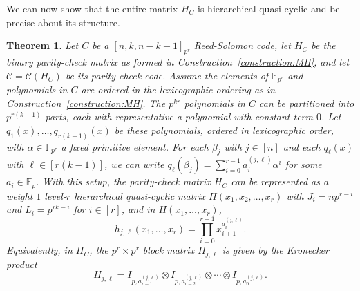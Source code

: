 \documentclass[11pt]{amsart}
\newtheorem{theorem}{Theorem}[section]
\theoremstyle{definition}
\newcommand{\0}{\mathbf{0}}
\newcommand{\F}{\mathbb{F}}
\begin{document}
We can now show that the entire matrix $H_C$ is hierarchical quasi-cyclic and be precise about its structure.

\begin{theorem} \label{thm:hqc-codes}
    Let $C$ be a $[n,k,n-k+1]_{p^r}$ Reed-Solomon code, let $H_C$ be the binary parity-check matrix as formed in Construction~\ref{construction:MH}, and let $\mathcal{C} = \mathcal{C}(H_C)$ be its parity-check code. Assume the elements of $\F_{p^r}$ and polynomials in $C$ are ordered in the lexicographic ordering as in Construction~\ref{construction:MH}. The $p^{kr}$ polynomials in $C$ can be partitioned into $p^{r(k-1)}$ parts, each with representative a polynomial with constant term $0$. Let $q_1(x), \dotsc, q_{r(k-1)}(x)$ be these polynomials, ordered in lexicographic order, with $\alpha \in \F_{p^r}$ a fixed primitive element. For each $\beta_j$ with $j \in [n]$ and each $q_\ell(x)$ with $\ell \in [r(k-1)]$, we can write $q_\ell(\beta_j) = \sum_{i=0}^{r-1} a_i^{(j,\ell)} \alpha^i$ for some $a_i \in \F_p$. With this setup, the parity-check matrix $H_C$ can be represented as a weight $1$ level-$r$ hierarchical quasi-cyclic matrix $H(x_1, x_2, \dotsc, x_{r})$ with $J_i = np^{r-i}$ and $L_i = p^{rk-i}$ for $i \in [r]$, and in $H(x_1, \dotsc, x_{r})$, 
    \begin{equation} \label{eq:polynomial}
        h_{j,\ell}(x_1, \dotsc, x_r) = \prod_{i=0}^{r-1} x_{i+1} ^{a_i^{(j,\ell)}}.
    \end{equation}
    Equivalently, in $H_C$, the $p^r \times p^r$ block matrix $H_{j,\ell}$ is given by the Kronecker product
    \begin{equation} \label{eq:kronecker}
        H_{j,\ell} = I_{p,a_{r-1}^{(j,\ell)}} \otimes I_{p,a_{r-2}^{(j,\ell)}} \otimes \dotsm \otimes I_{p,a_0^{(j,\ell)}}.
    \end{equation}
\end{theorem}
\end{document}
